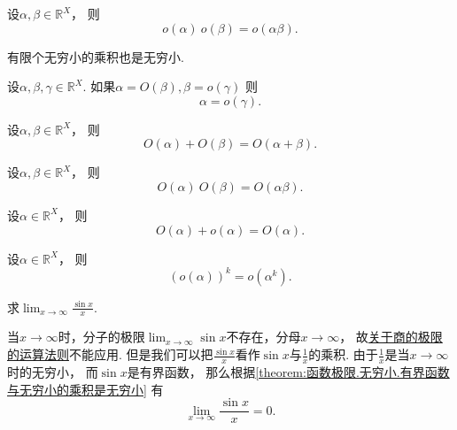 \begin{proposition}
设\(\alpha,\beta\in\mathbb{R}^X\)，
则\[
	o(\alpha)~o(\beta) = o(\alpha \beta).
\]
\end{proposition}
\begin{corollary}
有限个无穷小的乘积也是无穷小.
\end{corollary}

\begin{proposition}
设\(\alpha,\beta,\gamma\in\mathbb{R}^X\).
如果\(\alpha = O(\beta),
\beta = o(\gamma)\)
则\[
	\alpha = o(\gamma).
\]
\end{proposition}
\begin{proposition}
设\(\alpha,\beta\in\mathbb{R}^X\)，
则\[
	O(\alpha) + O(\beta) = O(\alpha + \beta).
\]
\end{proposition}
\begin{proposition}
设\(\alpha,\beta\in\mathbb{R}^X\)，
则\[
	O(\alpha)~O(\beta) = O(\alpha \beta).
\]
\end{proposition}
\begin{proposition}
设\(\alpha\in\mathbb{R}^X\)，
则\[
	O(\alpha) + o(\alpha) = O(\alpha).
\]
\end{proposition}
\begin{proposition}
设\(\alpha\in\mathbb{R}^X\)，
则\[
	(o(\alpha))^k = o(\alpha^k).
\]
\end{proposition}

\begin{example}
求\(\lim_{x\to\infty} \frac{\sin x}{x}\).
\begin{solution}
当\(x\to\infty\)时，分子的极限\(\lim_{x\to\infty} \sin x\)不存在，分母\(x\to\infty\)，
故\hyperref[theorem:极限.极限的四则运算法则]{关于商的极限的运算法则}不能应用.
但是我们可以把\(\frac{\sin x}{x}\)看作\(\sin x\)与\(\frac1x\)的乘积.
由于\(\frac1x\)是当\(x\to\infty\)时的无穷小，
而\(\sin x\)是有界函数，
那么根据\cref{theorem:函数极限.无穷小.有界函数与无穷小的乘积是无穷小}
有\begin{equation}
	\lim_{x\to\infty} \frac{\sin x}{x} = 0.
\end{equation}
\end{solution}
\end{example}

